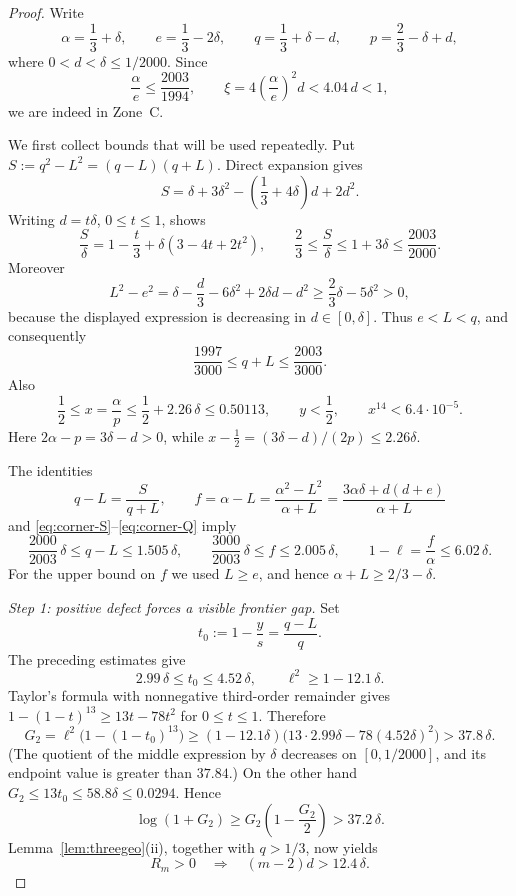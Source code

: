 \documentclass[11pt]{article}
\begin{document}
\begin{proof}
Write
\[
 \alpha=\frac13+\delta,\qquad e=\frac13-2\delta,\qquad
 q=\frac13+\delta-d,\qquad p=\frac23-\delta+d ,
\]
where $0<d<\delta\le1/2000$.  Since
\[
 \frac{\alpha}{e}\le\frac{2003}{1994},
 \qquad
 \xi=4\left(\frac{\alpha}{e}\right)^2d<4.04\,d<1,
\]
we are indeed in Zone~C.

We first collect bounds that will be used repeatedly.  Put
$S:=q^2-L^2=(q-L)(q+L)$.  Direct expansion gives
\begin{equation}\label{eq:corner-S}
 S=\delta+3\delta^2-\left(\frac13+4\delta\right)d+2d^2 .
\end{equation}
Writing $d=t\delta$, $0\le t\le1$, shows
\[
 \frac{S}{\delta}
 =1-\frac t3+\delta(3-4t+2t^2),
 \qquad
 \frac23\le\frac{S}{\delta}\le1+3\delta\le\frac{2003}{2000}.
\]
Moreover
\[
 L^2-e^2
 =\delta-\frac d3-6\delta^2+2\delta d-d^2
 \ge \frac23\delta-5\delta^2>0,
\]
because the displayed expression is decreasing in $d\in[0,\delta]$.
Thus $e<L<q$, and consequently
\begin{equation}\label{eq:corner-Q}
 \frac{1997}{3000}
 \le q+L\le\frac{2003}{3000}.
\end{equation}
Also
\[
 \frac12\le x=\frac{\alpha}{p}
 \le\frac12+2.26\,\delta\le0.50113,
 \qquad y<\frac12,
 \qquad x^{14}<6.4\cdot10^{-5}.
\]
Here $2\alpha-p=3\delta-d>0$, while
$x-\tfrac12=(3\delta-d)/(2p)\le2.26\delta$.

The identities
\[
 q-L=\frac{S}{q+L},
 \qquad
 f=\alpha-L=\frac{\alpha^2-L^2}{\alpha+L}
   =\frac{3\alpha\delta+d(d+e)}{\alpha+L}
\]
and \eqref{eq:corner-S}--\eqref{eq:corner-Q} imply
\begin{equation}\label{eq:corner-standing}
 \frac{2000}{2003}\,\delta\le q-L\le1.505\,\delta,
 \qquad
 \frac{3000}{2003}\,\delta\le f\le2.005\,\delta,
 \qquad
 1-\ell=\frac f\alpha\le6.02\,\delta .
\end{equation}
For the upper bound on $f$ we used $L\ge e$, and hence
$\alpha+L\ge2/3-\delta$.

\emph{Step 1: positive defect forces a visible frontier gap.}
Set
\[
 t_0:=1-\frac ys=\frac{q-L}{q}.
\]
The preceding estimates give
\[
 2.99\,\delta\le t_0\le4.52\,\delta,
 \qquad
 \ell^2\ge1-12.1\,\delta.
\]
Taylor's formula with nonnegative third-order remainder gives
$1-(1-t)^{13}\ge13t-78t^2$ for $0\le t\le1$.  Therefore
\[
 G_2=\ell^2\bigl(1-(1-t_0)^{13}\bigr)
 \ge(1-12.1\delta)
       \bigl(13\cdot2.99\delta-78(4.52\delta)^2\bigr)
 >37.8\,\delta.
\]
(The quotient of the middle expression by $\delta$ decreases on
$[0,1/2000]$, and its endpoint value is greater than $37.84$.)
On the other hand $G_2\le13t_0\le58.8\delta\le0.0294$.  Hence
\[
 \log(1+G_2)\ge G_2\left(1-\frac{G_2}{2}\right)>37.2\,\delta.
\]
Lemma~\ref{lem:threegeo}(ii), together with $q>1/3$, now yields
\begin{equation}\label{eq:corner-forcing}
 R_m>0\quad\Longrightarrow\quad
 (m-2)d>12.4\,\delta .
\end{equation}


\end{proof}
\end{document}
